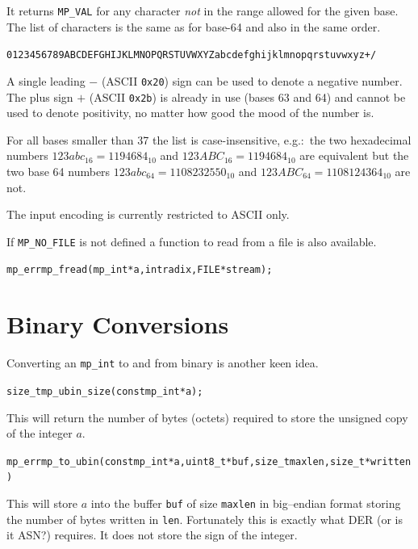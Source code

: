 \documentclass[synpaper]{book}
\begin{document}
It returns \texttt{MP\_VAL} for any character {\em not} in the range allowed for the given base.
The list of characters is the same as for base-64 and also in the same order.
\begin{alltt}
0123456789ABCDEFGHIJKLMNOPQRSTUVWXYZabcdefghijklmnopqrstuvwxyz+/
\end{alltt}

A single leading $-$ (ASCII \texttt{0x20}) sign can be used to denote a negative number. The
plus sign $+$ (ASCII \texttt{0x2b}) is already in use (bases 63 and 64) and cannot be used
to denote positivity, no matter how good the mood of the number is.

For all bases smaller than 37 the list is case-insensitive, e.g.:~the two hexadecimal numbers
$123abc_{16} = 1194684_{10}$ and $123ABC_{16} = 1194684_{10}$ are equivalent but the two base
64 numbers $123abc_{64} = 1108232550_{10}$ and $123ABC_{64} = 1108124364_{10}$ are not.

The input encoding is currently restricted to ASCII only.

If \texttt{MP\_NO\_FILE} is not defined a function to read from a file is also available.
\begin{alltt}
mp_err mp_fread(mp_int *a, int radix, FILE *stream);
\end{alltt}

\section{Binary Conversions}

Converting an \texttt{mp\_int} to and from binary is another keen idea.

\begin{alltt}
size_t mp_ubin_size(const mp_int *a);
\end{alltt}

This will return the number of bytes (octets) required to store the unsigned copy of the integer
$a$.

\begin{alltt}
mp_err mp_to_ubin(const mp_int *a, uint8_t *buf, size_t maxlen, size_t *written)
\end{alltt}
This will store $a$ into the buffer \texttt{buf} of size \texttt{maxlen} in big--endian format
storing the number of bytes written in \texttt{len}.  Fortunately this is exactly what DER (or is
it ASN?) requires.  It does not store the sign of the integer.
\end{document}
